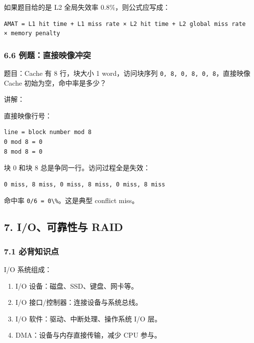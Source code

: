 \documentclass[
]{ctexart}
\newcommand{\passthrough}[1]{#1}
\providecommand{\tightlist}{%
  \setlength{\itemsep}{0pt}\setlength{\parskip}{0pt}}
\begin{document}
如果题目给的是 L2 全局失效率 0.8\%，则公式应写成：

\begin{lstlisting}
AMAT = L1 hit time + L1 miss rate × L2 hit time + L2 global miss rate × memory penalty
\end{lstlisting}

\subsubsection{6.6
例题：直接映像冲突}\label{ux4f8bux9898ux76f4ux63a5ux6620ux50cfux51b2ux7a81}

题目：Cache 有 8 行，块大小 1 word，访问块序列
\passthrough{\lstinline!0, 8, 0, 8, 0, 8!}，直接映像 Cache
初始为空，命中率是多少？

讲解：

直接映像行号：

\begin{lstlisting}
line = block number mod 8
0 mod 8 = 0
8 mod 8 = 0
\end{lstlisting}

块 0 和块 8 总是争同一行。访问过程全是失效：

\begin{lstlisting}
0 miss, 8 miss, 0 miss, 8 miss, 0 miss, 8 miss
\end{lstlisting}

命中率 \passthrough{\lstinline!0/6 = 0\%!}。这是典型 conflict miss。

\subsection{7. I/O、可靠性与
RAID}\label{ioux53efux9760ux6027ux4e0e-raid}

\subsubsection{7.1 必背知识点}\label{ux5fc5ux80ccux77e5ux8bc6ux70b9-6}

I/O 系统组成：

\begin{enumerate}
\def\labelenumi{\arabic{enumi}.}
\tightlist
\item
  I/O 设备：磁盘、SSD、键盘、网卡等。
\item
  I/O 接口/控制器：连接设备与系统总线。
\item
  I/O 软件：驱动、中断处理、操作系统 I/O 层。
\item
  DMA：设备与内存直接传输，减少 CPU 参与。
\end{enumerate}
\end{document}
